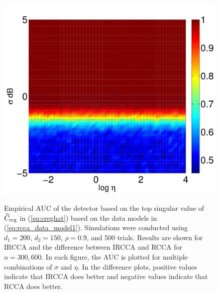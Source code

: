 \begin{figure}[h!]
{  \includegraphics[width=\figwidth]{figures/ircca_auc_heatmap_n_600.pdf} 
} 
\caption{Empirical AUC of the detector based on the top singular value of $\widetilde{C}_{\text{reg}}$ in
  (\ref{eq:creghat}) based on the data models in (\ref{eq:rcca_data_model1}). Simulations
  were conducted using $d_1=200$, $d_2=150$, $\rho=0.9$, and 500 trials. Results are shown for IRCCA and
  the difference between IRCCA and RCCA for $n=300,600$. In each figure, the AUC is plotted
  for multiple combinations of $\sigma$ and $\eta$. In the difference plots, positive
  values indicate that IRCCA does better and negative values indicate that RCCA does
  better.}
\label{fig:ircca_auc_heatmap2}
\end{figure}


